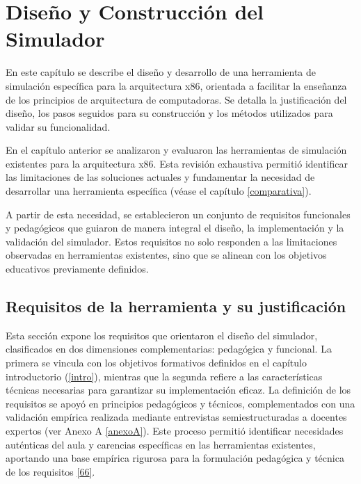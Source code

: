\documentclass[12pt,oneside]{templates/unerthesis}
\begin{document}
\hypertarget{desarrollo}{%
\chapter{Diseño y Construcción del Simulador}\label{desarrollo}}

En este capítulo se describe el diseño y desarrollo de una herramienta de simulación específica para la arquitectura x86, orientada a facilitar la enseñanza de los principios de arquitectura de computadoras. Se detalla la justificación del diseño, los pasos seguidos para su construcción y los métodos utilizados para validar su funcionalidad.

En el capítulo anterior se analizaron y evaluaron las herramientas de simulación existentes para la arquitectura x86. Esta revisión exhaustiva permitió identificar las limitaciones de las soluciones actuales y fundamentar la necesidad de desarrollar una herramienta específica (véase el capítulo \ref{comparativa}).

A partir de esta necesidad, se establecieron un conjunto de requisitos funcionales y pedagógicos que guiaron de manera integral el diseño, la implementación y la validación del simulador. Estos requisitos no solo responden a las limitaciones observadas en herramientas existentes, sino que se alinean con los objetivos educativos previamente definidos.

\hypertarget{requisitos-de-la-herramienta-y-su-justificaciuxf3n}{%
\section{Requisitos de la herramienta y su justificación}\label{requisitos-de-la-herramienta-y-su-justificaciuxf3n}}

Esta sección expone los requisitos que orientaron el diseño del simulador, clasificados en dos dimensiones complementarias: pedagógica y funcional. La primera se vincula con los objetivos formativos definidos en el capítulo introductorio (\ref{intro}), mientras que la segunda refiere a las características técnicas necesarias para garantizar su implementación eficaz. La definición de los requisitos se apoyó en principios pedagógicos y técnicos, complementados con una validación empírica realizada mediante entrevistas semiestructuradas a docentes expertos (ver Anexo A \ref{anexoA}). Este proceso permitió identificar necesidades auténticas del aula y carencias específicas en las herramientas existentes, aportando una base empírica rigurosa para la formulación pedagógica y técnica de los requisitos \protect\hyperlink{ref-huberman2019qualitative}{{[}66{]}}.
\end{document}
